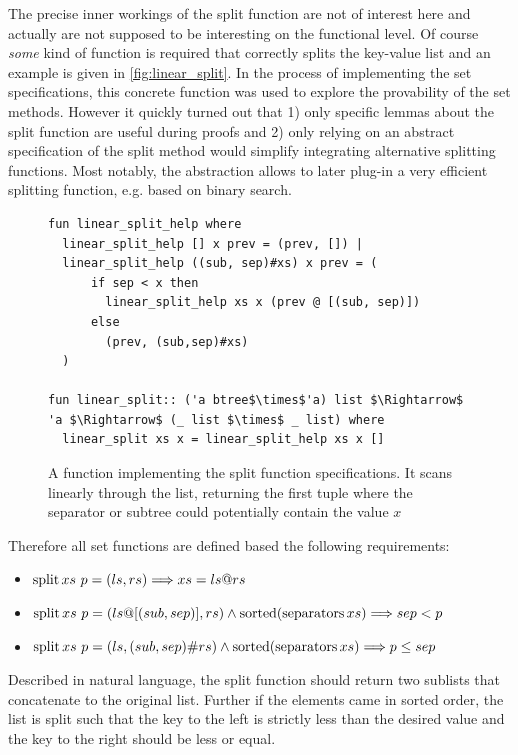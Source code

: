 The precise inner workings of the split function are not of interest here
and actually are not supposed to be interesting on the functional level.
Of course \textit{some} kind of function is required that correctly splits
the key-value list and an example is given in \autoref{fig:linear_split}.
In the process of implementing the set specifications,
this concrete function was used to explore the provability of the set methods.
However it quickly turned out that 1) only specific lemmas about the split
function are useful during proofs and 2) only relying on an abstract specification of
the split method would simplify integrating alternative splitting functions.
Most notably, the abstraction allows to later plug-in a very efficient splitting
function, e.g. based on binary search.

\begin{figure}
    
\begin{lstlisting}[mathescape=true, language=Isabelle]
fun linear_split_help where
  linear_split_help [] x prev = (prev, []) |
  linear_split_help ((sub, sep)#xs) x prev = (
      if sep < x then
        linear_split_help xs x (prev @ [(sub, sep)])
      else
        (prev, (sub,sep)#xs)
  )

fun linear_split:: ('a btree$\times$'a) list $\Rightarrow$ 'a $\Rightarrow$ (_ list $\times$ _ list) where
  linear_split xs x = linear_split_help xs x []
\end{lstlisting}
\caption{A function implementing the split function specifications.
It scans linearly through the list, returning the first tuple where the separator
or subtree could potentially contain the value $x$}
\label{fig:linear_split}

\end{figure}

Therefore all set functions are defined based the following requirements:

\begin{itemize}
    \item $\operatorname{split} xs\ p = (ls,rs) \Longrightarrow xs = ls @ rs$
    \item $\operatorname{split} xs\ p = (ls@[(sub,sep)],rs) \wedge \operatorname{sorted} (\operatorname{separators} xs) \Longrightarrow sep < p$
    \item $\operatorname{split} xs\ p = (ls,(sub,sep)\#rs) \wedge \operatorname{sorted} (\operatorname{separators} xs) \Longrightarrow p \le sep$
\end{itemize}

Described in natural language, the split function should return two sublists
that concatenate to the original list.
Further if the elements came in sorted order,
the list is split such that the key to the left is strictly less than the desired value
and the key to the right should be less or equal.

